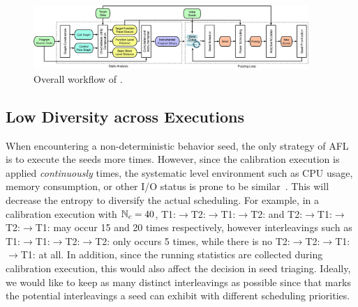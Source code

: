 \begin{figure}[ht]
    \centering
    \includegraphics[width=0.93\textwidth]{res/overview.pdf}
    \caption{Overall workflow of \mtfuzz.}
    \label{fig:workflow}
\end{figure} 
\subsection{Low Diversity across Executions}\label{sec:afl_issue_mt}
When encountering a non-deterministic behavior seed, the only strategy of AFL is to execute the seeds more times. However, since the calibration execution is applied \emph{continuously} \Ncal times, the systematic level environment such as CPU usage, memory consumption, or other I/O status is prone to be similar~\cite{posixstd,tlpi}. This will decrease the entropy to diversify the actual scheduling. For example, in a calibration execution with $\mathbb{N}_{c}=40$,  T1:$\rightarrow$T2:$\rightarrow$T1:$\rightarrow$T2: and T2:$\rightarrow$T1:$\rightarrow$T2:$\rightarrow$T1: may occur 15 and 20 times respectively, however interleavings such as T1:$\rightarrow$T1:$\rightarrow$T2:$\rightarrow$T2: only occurs 5 times, while there is no T2:$\rightarrow$T2:$\rightarrow$T1:$\rightarrow$T1: at all. In addition, since the running statistics are collected during calibration execution, this would also affect the decision in seed triaging. Ideally, we would like to keep as many distinct interleavings as possible since that marks the potential interleavings a seed can exhibit with different scheduling priorities.




